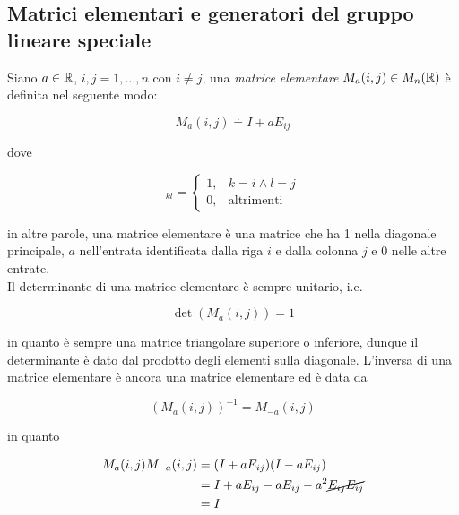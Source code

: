 \subsection{Matrici elementari e generatori del gruppo lineare speciale}

Siano $ a \in \mathbb{R} $, $ i,j=1,\dots,n $ con $ i \neq j $, una \textit{matrice elementare} $ M_{a}(i,j) \in M_{n}(\mathbb{R}) $ è definita nel seguente modo:

\begin{equation}
	M_{a}(i,j) \doteq I + a E_{ij}
\end{equation}

dove

\begin{equation}
	[E_{ij}]_{kl} = %
	\begin{cases}
		1, & k = i \wedge l = j \\
		0, & \text{altrimenti}
	\end{cases}
\end{equation}

in altre parole, una matrice elementare è una matrice che ha 1 nella diagonale principale, $ a $ nell'entrata identificata dalla riga $ i $ e dalla colonna $ j $ e 0 nelle altre entrate.\\
Il determinante di una matrice elementare è sempre unitario, i.e.

\begin{equation}
	\det(M_{a}(i,j)) = 1
\end{equation}

in quanto è sempre una matrice triangolare superiore o inferiore, dunque il determinante è dato dal prodotto degli elementi sulla diagonale. L'inversa di una matrice elementare è ancora una matrice elementare ed è data da

\begin{equation}
	(M_{a}(i,j))^{-1} = M_{-a}(i,j)
\end{equation}

in quanto

\begin{align}
	\begin{split}
		M_{a}(i,j) M_{-a}(i,j) &= (I + a E_{ij}) (I - a E_{ij}) \\
		&= I + a E_{ij} - a E_{ij} - a^{2} \cancel{E_{ij} E_{ij}} \\
		&= I
	\end{split}
\end{align}

